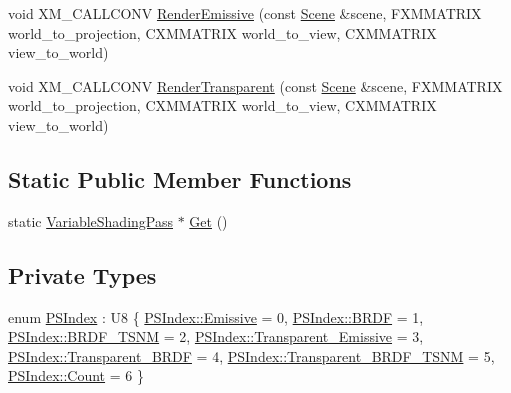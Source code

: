 \begin{DoxyCompactItemize}
\item 
void X\+M\+\_\+\+C\+A\+L\+L\+C\+O\+NV \hyperlink{classmage_1_1_variable_shading_pass_ad87641e6da5cd07655d5140ba4b7124c}{Render\+Emissive} (const \hyperlink{classmage_1_1_scene}{Scene} \&scene, F\+X\+M\+M\+A\+T\+R\+IX world\+\_\+to\+\_\+projection, C\+X\+M\+M\+A\+T\+R\+IX world\+\_\+to\+\_\+view, C\+X\+M\+M\+A\+T\+R\+IX view\+\_\+to\+\_\+world)
\item 
void X\+M\+\_\+\+C\+A\+L\+L\+C\+O\+NV \hyperlink{classmage_1_1_variable_shading_pass_a25910e7f22be1741b3e2c98bc23a4e33}{Render\+Transparent} (const \hyperlink{classmage_1_1_scene}{Scene} \&scene, F\+X\+M\+M\+A\+T\+R\+IX world\+\_\+to\+\_\+projection, C\+X\+M\+M\+A\+T\+R\+IX world\+\_\+to\+\_\+view, C\+X\+M\+M\+A\+T\+R\+IX view\+\_\+to\+\_\+world)
\end{DoxyCompactItemize}
\subsection*{Static Public Member Functions}
\begin{DoxyCompactItemize}
\item 
static \hyperlink{classmage_1_1_variable_shading_pass}{Variable\+Shading\+Pass} $\ast$ \hyperlink{classmage_1_1_variable_shading_pass_a4c5572071474485e60af17b34539a603}{Get} ()
\end{DoxyCompactItemize}
\subsection*{Private Types}
\begin{DoxyCompactItemize}
\item 
enum \hyperlink{classmage_1_1_variable_shading_pass_a99a5986785950a884405617f8d05cae5}{P\+S\+Index} \+: U8 \{ \newline
\hyperlink{classmage_1_1_variable_shading_pass_a99a5986785950a884405617f8d05cae5a3cb4ee67c41d819920d72fcc11b9b566}{P\+S\+Index\+::\+Emissive} = 0, 
\hyperlink{classmage_1_1_variable_shading_pass_a99a5986785950a884405617f8d05cae5a4e69f1c58994758054563aa7392ffa4c}{P\+S\+Index\+::\+B\+R\+DF} = 1, 
\hyperlink{classmage_1_1_variable_shading_pass_a99a5986785950a884405617f8d05cae5a12126b75c3073e66dcaed7ac43317a00}{P\+S\+Index\+::\+B\+R\+D\+F\+\_\+\+T\+S\+NM} = 2, 
\hyperlink{classmage_1_1_variable_shading_pass_a99a5986785950a884405617f8d05cae5a72d12be64d7b318fe15d5d0c8682feef}{P\+S\+Index\+::\+Transparent\+\_\+\+Emissive} = 3, 
\newline
\hyperlink{classmage_1_1_variable_shading_pass_a99a5986785950a884405617f8d05cae5aeb62f8bcb0bd36fba14e9fe3fcb12805}{P\+S\+Index\+::\+Transparent\+\_\+\+B\+R\+DF} = 4, 
\hyperlink{classmage_1_1_variable_shading_pass_a99a5986785950a884405617f8d05cae5a0cda01fc01db8201f5bee170d74f9771}{P\+S\+Index\+::\+Transparent\+\_\+\+B\+R\+D\+F\+\_\+\+T\+S\+NM} = 5, 
\hyperlink{classmage_1_1_variable_shading_pass_a99a5986785950a884405617f8d05cae5ae93f994f01c537c4e2f7d8528c3eb5e9}{P\+S\+Index\+::\+Count} = 6
 \}
\end{DoxyCompactItemize}
